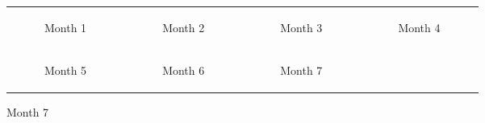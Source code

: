 \begin{minipage}[t]{0.7\textwidth}
\begin{figure}[H]
  \begin{adjustbox}{width=\textwidth, keepaspectratio}
      \begin{tabular}{cccc}
          \begin{subfigure}[b]{0.24\textwidth}
              \centering
              
              \caption{Month 1}
              \label{fig:month1}
          \end{subfigure} &
          \begin{subfigure}[b]{0.24\textwidth}
              \centering
              
              \caption{Month 2}
              \label{fig:month2}
          \end{subfigure} &
          \begin{subfigure}[b]{0.24\textwidth}
              \centering
              
              \caption{Month 3}
              \label{fig:month3}
          \end{subfigure} &
          \begin{subfigure}[b]{0.24\textwidth}
              \centering
              
              \caption{Month 4}
              \label{fig:month4}
          \end{subfigure} \\
          \begin{subfigure}[b]{0.24\textwidth}
              \centering
              
              \caption{Month 5}
              \label{fig:month5}
          \end{subfigure} &
          \begin{subfigure}[b]{0.24\textwidth}
              \centering
              
              \caption{Month 6}
              \label{fig:month6}
          \end{subfigure} &
          \begin{subfigure}[b]{0.24\textwidth}
              \centering
              
              \caption{Month 7}
              \label{fig:month7}

\end{subfigure}
\end{tabular}
\end{adjustbox}
\end{figure}
\end{minipage}
